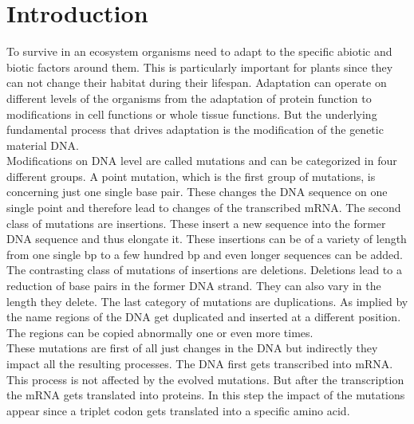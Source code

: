 \chapter{Introduction}
To survive in an ecosystem organisms need to adapt to the specific abiotic and biotic factors around them. This is particularly important for plants since they can not change their habitat during their lifespan. Adaptation can operate on different levels of the organisms from the adaptation of protein function to modifications in cell functions or whole tissue functions. But the underlying fundamental process that drives adaptation is the modification of the genetic material DNA.\\
Modifications on DNA level are called mutations and can be categorized in four different groups. A point mutation, which is the first group of mutations, is concerning just one single base pair. These changes the DNA sequence on one single point and therefore lead to changes of the transcribed mRNA. The second class of mutations are insertions. These insert a new sequence into the former DNA sequence and thus elongate it. These insertions can be of a variety of length from one single bp to a few hundred bp and even longer sequences can be added.  The contrasting class of mutations of insertions are deletions. Deletions lead to a reduction of base pairs in the former DNA strand. They can also vary in the length they delete. The last category of mutations are duplications. As implied by the name regions of the DNA get duplicated and inserted at a different position. The regions can be copied abnormally one or even more times.\\
These mutations are first of all just changes in the DNA but indirectly they impact all the resulting processes. The DNA first gets transcribed into mRNA. This process is not affected by the evolved mutations. But after the transcription the mRNA gets translated into proteins. In this step the impact of the mutations appear since a triplet codon gets translated into a specific amino acid. 
